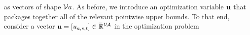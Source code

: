 as vectors of shape $\mathcal V a$.
As before, we introduce an optimization variable $\mathbf{u}$ that packages together
    all of the relevant pointwise upper bounds.
To that end, consider a 
vector
$\mathbf{u} = [u_{a,s,t}] \in \mskip1mu\overline{\mskip-1mu\mathbb R\!}\,^{\mathcal V\!\mathcal A}$
in the optimization problem
%
%
